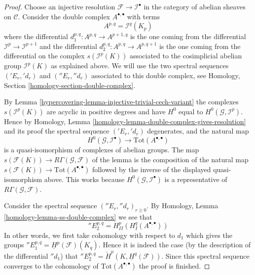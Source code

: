 \begin{proof}

Choose an injective resolution $\mathcal{F} \to \mathcal{I}^\bullet$
in the category of abelian sheaves on $\mathcal{C}$. Consider the
double complex $A^{\bullet, \bullet}$ with terms
$$
A^{p, q} = \mathcal{I}^q(K_p)
$$
where the differential $d_1^{p, q} : A^{p, q} \to A^{p + 1, q}$
is the one coming from the differential $\mathcal{I}^p \to \mathcal{I}^{p + 1}$
and the differential $d_2^{p, q} : A^{p, q} \to A^{p, q + 1}$ is the
one coming from the differential on the complex
$s(\mathcal{I}^p(K))$ associated to the cosimplicial abelian group
$\mathcal{I}^p(K)$ as explained above.
We will use the two spectral
sequences $({}'E_r, {}'d_r)$ and $({}''E_r, {}''d_r)$
associated to this double complex, see
Homology, Section \ref{homology-section-double-complex}.

\medskip\noindent
By Lemma \ref{hypercovering-lemma-injective-trivial-cech-variant} the complexes
$s(\mathcal{I}^p(K))$ are acyclic in positive degrees and have
$H^0$ equal to $H^0(\mathcal{G}, \mathcal{I}^p)$. Hence by
Homology, Lemma \ref{homology-lemma-double-complex-gives-resolution}
and its proof the spectral sequence $({}'E_r, {}'d_r)$ degenerates,
and the natural map
$$
H^0(\mathcal{G}, \mathcal{I}^\bullet) \longrightarrow
\text{Tot}(A^{\bullet, \bullet})
$$
is a quasi-isomorphism of complexes of abelian groups. The map
$s(\mathcal{F}(K)) \longrightarrow R\Gamma(\mathcal{G}, \mathcal{F})$
of the lemma is the composition of the natural map
$s(\mathcal{F}(K)) \to \text{Tot}(A^{\bullet, \bullet})$
followed by the inverse of the displayed quasi-isomorphism above.
This works because $H^0(\mathcal{G}, \mathcal{I}^\bullet)$
is a representative of $R\Gamma(\mathcal{G}, \mathcal{F})$.

\medskip\noindent
Consider the spectral sequence $({}''E_r, {}''d_r)_{r \geq 0}$. By
Homology, Lemma \ref{homology-lemma-ss-double-complex}
we see that
$$
{}''E_2^{p, q} = H^p_{II}(H^q_I(A^{\bullet, \bullet}))
$$
In other words, we first take cohomology with respect to
$d_1$ which gives the groups
${}''E_1^{p, q} = \underline{H}^p(\mathcal{F})(K_q)$.
Hence it is indeed the case (by the description of the differential
${}''d_1$) that
${}''E_2^{p, q} = \check{H}^p(K, \underline{H}^q(\mathcal{F}))$.
Since this spectral sequence converges to the cohomology of
$\text{Tot}(A^{\bullet, \bullet})$ the proof is finished.
\end{proof}

